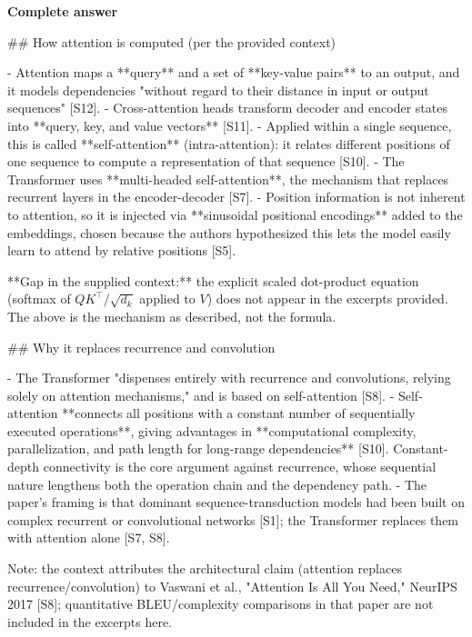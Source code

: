 \documentclass[10pt]{article}
\begin{document}
\textbf{Complete answer}
\begin{AnswerText}
## How attention is computed (per the provided context)

- Attention maps a **query** and a set of **key-value pairs** to an output, and it models dependencies "without regard to their distance in input or output sequences" [S12].
- Cross-attention heads transform decoder and encoder states into **query, key, and value vectors** [S11].
- Applied within a single sequence, this is called **self-attention** (intra-attention): it relates different positions of one sequence to compute a representation of that sequence [S10].
- The Transformer uses **multi-headed self-attention**, the mechanism that replaces recurrent layers in the encoder-decoder [S7].
- Position information is not inherent to attention, so it is injected via **sinusoidal positional encodings** added to the embeddings, chosen because the authors hypothesized this lets the model easily learn to attend by relative positions [S5].

**Gap in the supplied context:** the explicit scaled dot-product equation (softmax of $QK^{\top}/\sqrt{d_k}$ applied to $V$) does not appear in the excerpts provided. The above is the mechanism as described, not the formula.

## Why it replaces recurrence and convolution

- The Transformer "dispenses entirely with recurrence and convolutions, relying solely on attention mechanisms," and is based on self-attention [S8].
- Self-attention **connects all positions with a constant number of sequentially executed operations**, giving advantages in **computational complexity, parallelization, and path length for long-range dependencies** [S10]. Constant-depth connectivity is the core argument against recurrence, whose sequential nature lengthens both the operation chain and the dependency path.
- The paper's framing is that dominant sequence-transduction models had been built on complex recurrent or convolutional networks [S1]; the Transformer replaces them with attention alone [S7, S8].

Note: the context attributes the architectural claim (attention replaces recurrence/convolution) to Vaswani et al., "Attention Is All You Need," NeurIPS 2017 [S8]; quantitative BLEU/complexity comparisons in that paper are not included in the excerpts here.
\end{AnswerText}
\end{document}
